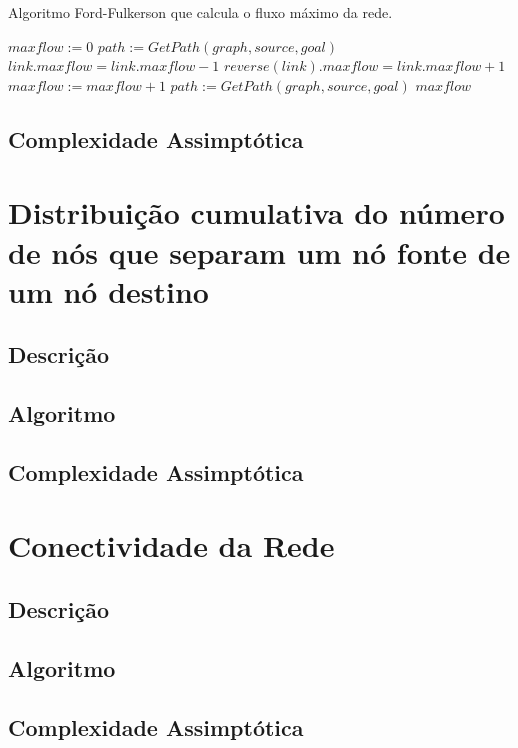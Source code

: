 \documentclass[12pt,a4paper]{scrartcl}
\begin{document}
\begin{algorithm}
\caption{Algoritmo Ford-Fulkerson que calcula o fluxo máximo da rede.}\label{alg:residual_network}
\begin{algorithmic}[1]
    \State $maxflow := 0 $
    \State $path := GetPath(graph,source,goal)$
        	\State $link.maxflow = link.maxflow - 1$
        	\State $reverse(link).maxflow = link.maxflow + 1$
      \EndFor
      \State $maxflow := maxflow + 1 $
      \State $path := GetPath(graph,source,goal)$
  	\EndWhile
  	\Return $maxflow$
\EndProcedure
\end{algorithmic}
\end{algorithm}

\subsection{Complexidade Assimptótica}

\section{Distribuição cumulativa do número de nós que separam um nó fonte de um nó destino}

\subsection{Descrição}

\subsection{Algoritmo}

\subsection{Complexidade Assimptótica}

\section{Conectividade da Rede}

\subsection{Descrição}

\subsection{Algoritmo}

\subsection{Complexidade Assimptótica}
\end{document}
